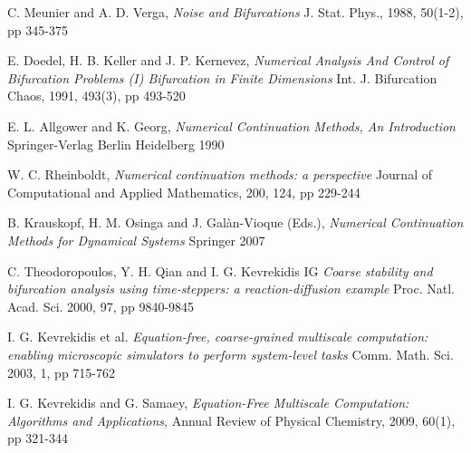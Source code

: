 \documentclass[11pt]{article}
\begin{document}
 
\begin{thebibliography}{10}  

{\sc C. Meunier and A. D. Verga},
{\it Noise and Bifurcations}
J. Stat. Phys., 1988, 50(1-2), pp 345-375

{\sc E. Doedel, H. B. Keller and J. P. Kernevez},
{\it Numerical Analysis And Control of Bifurcation Problems (I) Bifurcation in Finite Dimensions}
Int. J. Bifurcation Chaos, 1991, 493(3), pp 493-520

{\sc E. L. Allgower and K. Georg},
{\it Numerical Continuation Methods, An Introduction}
Springer-Verlag Berlin Heidelberg 1990

{\sc W. C. Rheinboldt},
{\it Numerical continuation methods: a perspective}
Journal of Computational and Applied Mathematics, 200, 124, pp 229-244

{\sc B. Krauskopf, H. M. Osinga and J. Gal\`{a}n-Vioque (Eds.)},
{\it Numerical Continuation Methods for Dynamical Systems}
Springer 2007

{\sc C. Theodoropoulos, Y. H. Qian and I. G. Kevrekidis IG}
{\it Coarse stability and bifurcation analysis using time-steppers: a reaction-diffusion example}
Proc. Natl. Acad. Sci. 2000, 97, pp 9840-9845

{\sc I. G. Kevrekidis et al.} 
{\it Equation-free, coarse-grained multiscale computation: enabling microscopic simulators to perform system-level tasks}
Comm. Math. Sci. 2003, 1, pp 715-762 

{\sc I. G. Kevrekidis and G. Samaey},
{\it Equation-Free Multiscale Computation: Algorithms and Applications},
Annual Review of Physical Chemistry, 2009, 60(1), pp 321-344


\end{thebibliography} 
\end{document}
